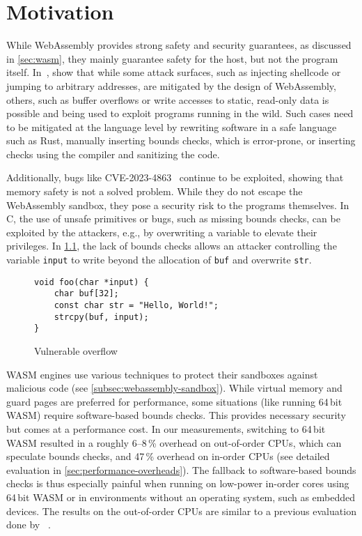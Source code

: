 \chapter{Motivation}
\label{ch:motivation}

While WebAssembly provides strong safety and security guarantees, as discussed in \cref{sec:wasm}, they mainly guarantee safety for the host, but not the program itself.
In~\cite{lehmann2020everything}, \citeauthor*{lehmann2020everything} show that while some attack surfaces, such as injecting shellcode or jumping to arbitrary addresses, are mitigated by the design of WebAssembly, others, such as buffer overflows or write accesses to static, read-only data is possible and being used to exploit programs running in the wild.
Such cases need to be mitigated at the language level by rewriting software in a safe language such as Rust, manually inserting bounds checks, which is error-prone, or inserting checks using the compiler and sanitizing the code.

Additionally, bugs like {CVE-2023-4863}~\cite{CVE-2023-4863} continue to be exploited, showing that memory safety is not a solved problem.
While they do not escape the WebAssembly sandbox, they pose a security risk to the programs themselves.
In C, the use of unsafe primitives or bugs, such as missing bounds checks, can be exploited by the attackers, e.g., by overwriting a variable to elevate their privileges.
In \cref{fig:vulnerable-overflow}, the lack of bounds checks allows an attacker controlling the variable \texttt{input} to write beyond the allocation of \texttt{buf} and overwrite \texttt{str}.

\begin{figure}[h]
    \centering
    \begin{lstlisting}[frame=h,style=customc,label={lst:vulnerable-overflow}]
void foo(char *input) {
    char buf[32];
    const char str = "Hello, World!";
    strcpy(buf, input);
}
    \end{lstlisting}
    \caption{Vulnerable overflow}
    \label{fig:vulnerable-overflow}
\end{figure}

\Ac{WASM} engines use various techniques to protect their sandboxes against malicious code (see \cref{subsec:webassembly-sandbox}).
While virtual memory and guard pages are preferred for performance, some situations (like running 64\,bit \ac{WASM}) require software-based bounds checks.
This provides necessary security but comes at a performance cost.
In our measurements, switching to 64\,bit \ac{WASM} resulted in a roughly 6--8\,\% overhead on out-of-order CPUs, which can speculate bounds checks, and 47\,\% overhead on in-order CPUs (see detailed evaluation in \cref{sec:performance-overheads}).
The fallback to software-based bounds checks is thus especially painful when running on low-power in-order cores using 64\,bit \ac{WASM} or in environments without an operating system, such as embedded devices.
The results on the out-of-order CPUs are similar to a previous evaluation done by \citeauthor*{szewczyk2022leaps}~\cite{szewczyk2022leaps}.


